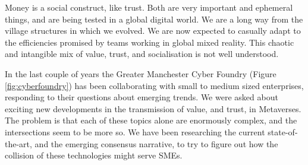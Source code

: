 Money is a social construct, like trust. Both are very important and ephemeral things, and are being tested in a global digital world.  We are a long way from the village structures in which we evolved. We are now expected to casually adapt to the efficiencies promised by teams working in global mixed reality. This chaotic and intangible mix of value, trust, and socialisation is not well understood.\par
In the last couple of years the Greater Manchester Cyber Foundry (Figure \ref{fig:cyberfoundry}) has been collaborating with small to medium sized enterprises, responding to their questions about emerging trends. We were asked about exciting new developments in the transmission of value, and trust, in Metaverses. The problem is that each of these topics alone are enormously complex, and the intersections seem to be more so. We have been researching the current state-of-the-art, and the emerging consensus narrative, to try to figure out how the collision of these technologies might serve SMEs. 


